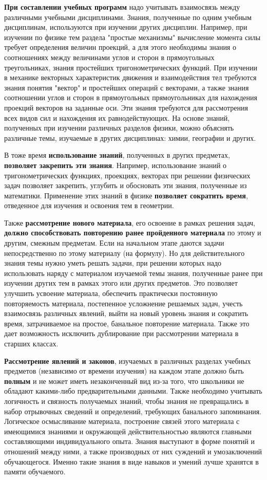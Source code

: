 \textbf{При составлении учебных программ} надо учитывать взаимосвязь между различными учебными дисциплинами. Знания, полученные по одним учебным дисциплинам, используются при изучении других дисциплин. Например, при изучении по физике тем раздела "простые механизмы"{} вычисление момента силы требует определения величин проекций, а для этого необходимы знания о соотношениях между величинами углов и сторон в прямоугольных треугольниках, знания простейших тригонометрических функций. При изучении в механике векторных характеристик движения и взаимодействия тел требуются знания понятия "вектор"{} и простейших операций с векторами, а также знания соотношении углов и сторон в прямоугольных прямоугольниках для нахождения проекций векторов на заданные оси. Эти знания требуются для рассмотрения всех видов сил и нахождения их равнодействующих. На основе знаний, полученных при изучении различных разделов физики, можно объяснять различные темы, изучаемые в других дисциплинах: химии, географии и других.

В тоже время \textbf{использование знаний}, полученных в других предметах, \textbf{позволяет закрепить эти знания}. Например, использование знаний о тригонометрических функциях, проекциях, векторах при решении физических задач позволяет закрепить, углубить и обосновать эти знания, полученные из математики. Применение этих знаний в физике \textbf{позволяет сократить время}, отведенное для изучения и освоения тем в геометрии. 

Также \textbf{рассмотрение нового материала}, его освоение в рамках решения задач, \textbf{должно способствовать повторению ранее пройденного материала} по этому и другим, смежным предметам. Если на начальном этапе даются задачи непосредственно по этому материалу (на формулу). Но для действительного знания темы нужно уметь решать задачи, при решении которых надо использовать наряду с материалом изучаемой темы знания, полученные ранее при изучении других тем в рамках этого или других предметов. Это позволяет улучшить усвоение материала, обеспечить практически постоянную повторяемость материала, постепенное усложнение решаемых задач, учесть взаимосвязь различных явлений, выйти на новый уровень знания и сократить время, затрачиваемое на простое, банальное повторение материала. Также это дает возможность исключить дублирование при рассмотрении материала в старших классах. 

\textbf{Рассмотрение явлений и законов}, изучаемых в различных разделах учебных предметов (независимо от времени изучения) на каждом этапе должно быть \textbf{полным} и не может иметь незаконченный вид из-за того, что школьники не обладают какими-либо предварительными данными. Также необходимо учитывать логичность и связность получаемых знаний, чтобы знания не превращались в набор отрывочных сведений и определений, требующих банального запоминания. Логическое осмысливание материала, построение связей этого материала с имеющимися знаниями и окружающей действительностью являются главными составляющими индивидуального опыта. Знания выступают в форме понятий и отношений между ними, а также производных от них суждений и умозаключений обучающегося. Именно такие знания в виде навыков и умений лучше хранятся в памяти обучаемого.

